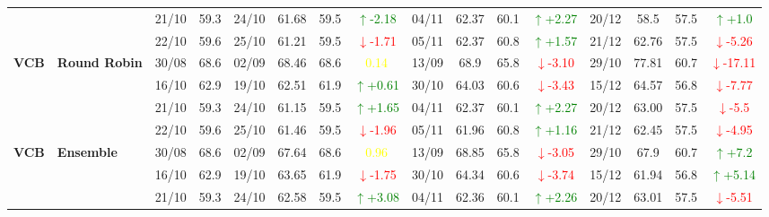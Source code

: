 \documentclass{ieeeaccess}
\begin{document}
{\begin{longtable}{llcc|cccc|cccc|cccc}
&
& 21/10 & 59.3 & 24/10 & 61.68 & 59.5 & \textcolor{green}{\(\uparrow\)-2.18} & 04/11 & 62.37 & 60.1 & \textcolor{green}{\(\uparrow\)+2.27} & 20/12 & 58.5 & 57.5 & \textcolor{green}{\(\uparrow\)+1.0} \\

&
& 22/10 & 59.6 & 25/10 & 61.21 & 59.5 & \textcolor{red}{\(\downarrow\)-1.71} & 05/11 & 62.37 & 60.8 & \textcolor{green}{\(\uparrow\)+1.57} & 21/12 & 62.76 & 57.5 & \textcolor{red}{\(\downarrow\)-5.26} \\
\midrule


\multirow{4}{*}{\textbf{VCB}} 
& \textbf{Round Robin}
& 30/08 & 68.6 & 02/09 & 68.46 & 68.6 & \textcolor{yellow}{0.14} & 13/09 & 68.9 & 65.8 & \textcolor{red}{\(\downarrow\)-3.10} & 29/10 & 77.81 & 60.7 & \textcolor{red}{\(\downarrow\)-17.11} \\

&
& 16/10 & 62.9 & 19/10 & 62.51 & 61.9 & \textcolor{green}{\(\uparrow\)+0.61} & 30/10 & 64.03 & 60.6 & \textcolor{red}{\(\downarrow\)-3.43} & 15/12 & 64.57 & 56.8 & \textcolor{red}{\(\downarrow\)-7.77} \\

&
& 21/10 & 59.3 & 24/10 & 61.15 & 59.5 & \textcolor{green}{\(\uparrow\)+1.65} & 04/11 & 62.37 & 60.1 & \textcolor{green}{\(\uparrow\)+2.27} & 20/12 & 63.00 & 57.5 & \textcolor{red}{\(\downarrow\)-5.5} \\

&
& 22/10 & 59.6 & 25/10 & 61.46 & 59.5 & \textcolor{red}{\(\downarrow\)-1.96} & 05/11 & 61.96 & 60.8 & \textcolor{green}{\(\uparrow\)+1.16} & 21/12 & 62.45 & 57.5 & \textcolor{red}{\(\downarrow\)-4.95} \\
\midrule

\multirow{4}{*}{\textbf{VCB}} 
& \textbf{Ensemble}
& 30/08 & 68.6 & 02/09 & 67.64 & 68.6 & \textcolor{yellow}{0.96} & 13/09 & 68.85 & 65.8 & \textcolor{red}{\(\downarrow\)-3.05} & 29/10 & 67.9 & 60.7 & \textcolor{green}{\(\uparrow\)+7.2} \\

&
& 16/10 & 62.9 & 19/10 & 63.65 & 61.9 & \textcolor{red}{\(\downarrow\)-1.75} & 30/10 & 64.34 & 60.6 & \textcolor{red}{\(\downarrow\)-3.74} & 15/12 & 61.94 & 56.8 & \textcolor{green}{\(\uparrow\)+5.14} \\

&
& 21/10 & 59.3 & 24/10 & 62.58 & 59.5 & \textcolor{green}{\(\uparrow\)+3.08} & 04/11 & 62.36 & 60.1 & \textcolor{green}{\(\uparrow\)+2.26} & 20/12 & 63.01 & 57.5 & \textcolor{red}{\(\downarrow\)-5.51} \\


\end{longtable}}
\end{document}
